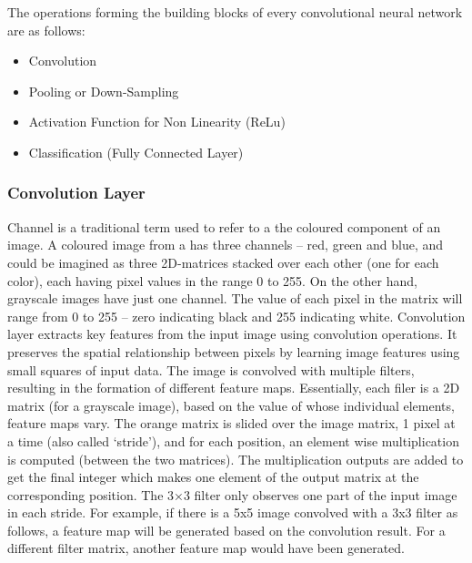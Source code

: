 The operations forming the building blocks of every convolutional neural network are as follows:
\begin{itemize}
\item Convolution
\item Pooling or Down-Sampling
\item Activation Function for Non Linearity (ReLu)
\item Classification (Fully Connected Layer)
\end{itemize}

\subsubsection*{Convolution Layer}
\label{sect5_1_2_1a_a}
Channel is a traditional term used to refer to a the coloured component of an image. A coloured image from a has three channels – red, green and blue, and could be imagined as three 2D-matrices stacked over each other (one for each color), each having pixel values in the range 0 to 255.\newline\newline
On the other hand, grayscale images have just one channel. The value of each pixel in the matrix will range from 0 to 255 – zero indicating black and 255 indicating white. Convolution layer extracts key features from the input image using convolution operations. It preserves the spatial relationship between pixels by learning image features using small squares of input data.\newline\newline
The image is convolved with multiple filters, resulting in the formation of different feature maps. Essentially, each filer is a 2D matrix (for a grayscale image), based on the value of whose individual elements, feature maps vary. \newline\newline
The orange matrix is slided over the image matrix, 1 pixel  at a time (also called ‘stride’), and for each position, an element wise multiplication is computed (between the two matrices). The multiplication outputs are added to get the final integer which makes one element of the output matrix at the corresponding position. The 3×3 filter only observes one part of the input image in each stride.\newline\newline
For example, if there is a 5x5 image convolved with a 3x3 filter as follows, a feature map will be generated based on the convolution result. For a different filter matrix, another feature map would have been generated.\newline\newline
